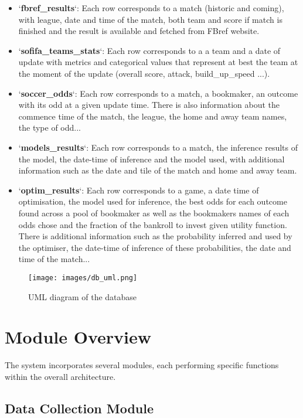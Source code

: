 \begin{itemize}
    \item `\textbf{fbref\_results}`: Each row corresponds to a match (historic and coming), with league, date and time of the match, both team and score if match is finished and the result is available and fetched from FBref website.
    \item `\textbf{sofifa\_teams\_stats}`: Each row corresponds to a a team and a date of update with metrics and categorical values that represent at best the team at the moment of the update (overall score, attack, build\_up\_speed ...).
    \item `\textbf{soccer\_odds}`: Each row corresponds to a match, a bookmaker, an outcome with its odd at a given update time. There is also information about the commence time of the match, the league, the home and away team names, the type of odd...
    \item `\textbf{models\_results}`: Each row corresponds to a match, the inference results of the model, the date-time of inference and the model used, with additional information such as the date and tile of the match and home and away team.
    \item `\textbf{optim\_results}`: Each row corresponds to a game, a date time of optimisation, the model used for inference, the best odds for each outcome found across a pool of bookmaker as well as the bookmakers names of each odds chose and the fraction of the bankroll to invest given utility function. There is additional information such as the probability inferred and used by the optimiser, the date-time of inference of these probabilities, the date and time of the match...
\end{itemize}


\begin{figure}[H]
    \centering
    \texttt{[image: images/db\_uml.png]}
    \caption{UML diagram of the database}
    \label{fig:uml_db}
\end{figure}

\section{Module Overview}

The system incorporates several modules, each performing specific functions within the overall architecture.

\subsection{Data Collection Module}

